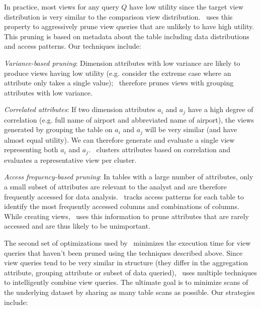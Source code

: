 
In practice, most views for any query $Q$ have low utility since the target view
distribution is very similar to the comparison view distribution. 
\SeeDB\ uses this property to aggressively prune 
view queries that are unlikely to have high utility. 
This pruning is based on metadata about the table including data
distributions and access patterns. Our techniques include:
\begin{denselist}
\item {\it Variance-based pruning}: Dimension attributes with low variance are
likely to produce views having low utility (e.g. consider the extreme case where
an attribute only takes a single value); \SeeDB\ therefore prunes views
with grouping attributes with low variance.
\item {\it Correlated attributes}: If two dimension attributes $a_i$ and $a_j$ have
a high degree of correlation (e.g. full name of airport and abbreviated name of
airport), the views generated by grouping the table on $a_i$ and $a_j$ will be
very similar (and have almost equal utility). We can therefore generate and
evaluate a single view representing both $a_i$ and $a_j$. \SeeDB\ clusters
attributes based on correlation and evaluates a representative view per
cluster.
\item {\it Access frequency-based pruning}: In tables with a large number of
attributes, only a small subset of attributes are relevant to the analyst and
are therefore frequently accessed for data analysis. \SeeDB\ tracks access patterns
for each table to identify the most frequently accessed columns and combinations of
columns. While creating views, \SeeDB\ uses this information to prune attributes
that are rarely accessed and are thus likely to be unimportant.
\end{denselist}

The second set of optimizations used by \SeeDB\ minimizes the execution time for
view queries that haven't been pruned using the techniques described above.
Since view queries tend to be very similar in structure (they differ in the aggregation
attribute, grouping attribute or subset of data queried), \SeeDB\ uses multiple
techniques to intelligently combine view queries.
The ultimate goal is to minimize scans of the underlying dataset by sharing as
many table scans as possible. Our strategies include:

